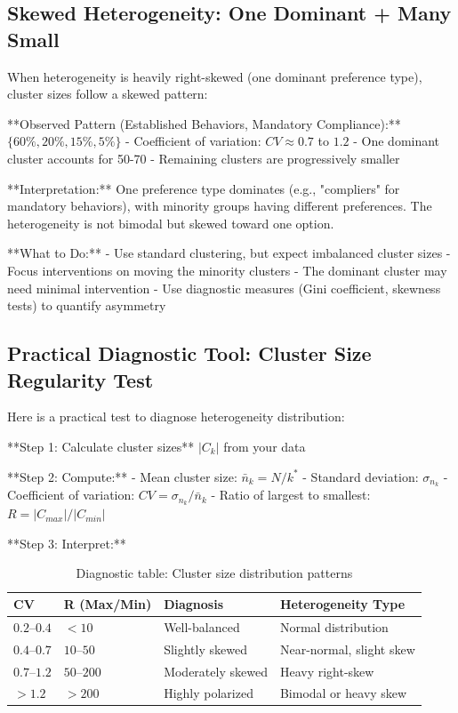 \subsection{Skewed Heterogeneity: One Dominant + Many Small}

When heterogeneity is heavily right-skewed (one dominant preference type), cluster sizes
follow a skewed pattern:

**Observed Pattern (Established Behaviors, Mandatory Compliance):** $\{60\%, 20\%, 15\%, 5\%\}$
- Coefficient of variation: $CV \approx 0.7$ to $1.2$
- One dominant cluster accounts for 50-70%
- Remaining clusters are progressively smaller

**Interpretation:** One preference type dominates (e.g., "compliers" for mandatory behaviors),
with minority groups having different preferences. The heterogeneity is not bimodal but
skewed toward one option.

**What to Do:**
- Use standard clustering, but expect imbalanced cluster sizes
- Focus interventions on moving the minority clusters
- The dominant cluster may need minimal intervention
- Use diagnostic measures (Gini coefficient, skewness tests) to quantify asymmetry

\subsection{Practical Diagnostic Tool: Cluster Size Regularity Test}

Here is a practical test to diagnose heterogeneity distribution:

**Step 1: Calculate cluster sizes** $|C_k|$ from your data

**Step 2: Compute:**
- Mean cluster size: $\bar{n}_k = N / k^*$
- Standard deviation: $\sigma_{n_k}$
- Coefficient of variation: $CV = \sigma_{n_k} / \bar{n}_k$
- Ratio of largest to smallest: $R = |C_{max}| / |C_{min}|$

**Step 3: Interpret:**

\begin{table}[h]
\centering
\small
\begin{tabular}{llll}
\toprule
\textbf{CV} & \textbf{R (Max/Min)} & \textbf{Diagnosis} & \textbf{Heterogeneity Type} \\
\midrule
$0.2$--$0.4$ & $< 10$ & Well-balanced & Normal distribution \\
$0.4$--$0.7$ & $10$--$50$ & Slightly skewed & Near-normal, slight skew \\
$0.7$--$1.2$ & $50$--$200$ & Moderately skewed & Heavy right-skew \\
$> 1.2$ & $> 200$ & Highly polarized & Bimodal or heavy skew \\
\bottomrule
\end{tabular}
\caption{Diagnostic table: Cluster size distribution patterns}
\label{tab:cluster-size-diagnosis}
\end{table}

